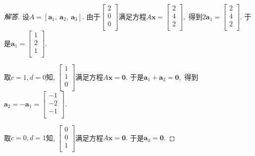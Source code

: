 \documentclass[UTF8]{ctexart}
\newcommand\bs[1]{\boldsymbol{ #1}}
\begin{document}
\begin{proof}[解答]
设$A = [\bs a_1,~ \bs a_2, ~ \bs a_3].$ 由于$\begin{bmatrix} 2 \\ 0 \\ 0 \\ \end{bmatrix}$满足方程$A\bs x= \begin{bmatrix} 2 \\ 4 \\ 2 \\ \end{bmatrix} ,$ 得到$2 \bs a_1 = \begin{bmatrix} 2 \\ 4 \\ 2 \\ \end{bmatrix} .$ 于是$\bs a_1 = \begin{bmatrix} 1 \\ 2 \\ 1 \\ \end{bmatrix} .$

取$c = 1, d= 0$知, $\begin{bmatrix} 1 \\ 1 \\ 0 \\ \end{bmatrix}$满足方程$A \bs x = \bs 0.$ 于是$\bs a_1 + \bs a_2 = \bs 0,$ 得到$\bs a_2 = -\bs a_1 = \begin{bmatrix} -1 \\ -2 \\ -1 \\ \end{bmatrix} .$

取$c = 0, d= 1$知, $\begin{bmatrix} 0 \\ 0 \\ 1 \\ \end{bmatrix}$满足方程$A \bs x = \bs 0.$ 于是$ \bs a_3 = \bs 0.$
\end{proof}
\end{document}
